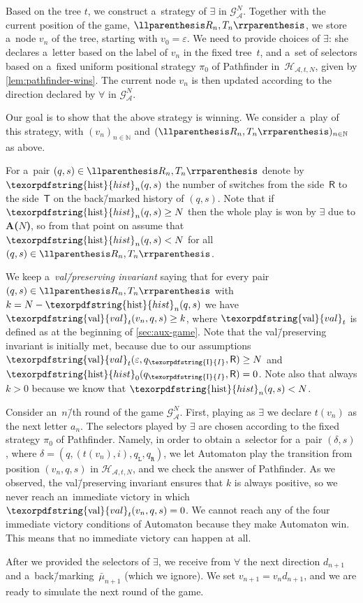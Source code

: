 \documentclass[11pt,a4paper]{amsart}
\theoremstyle{plain}
\theoremstyle{definition}
\theoremstyle{defC}
\theoremstyle{thmC}
\theoremstyle{plain}
\numberwithin{equation}{section}
\numberwithin{equation}{section}
\numberwithin{figure}{section}
\newcommand{\ident}[1]{\ensuremath{\texorpdfstring{\mathrm{\mathnm{#1}}}{#1}}\xspace}
\newcommand{\domain}[1]{\ensuremath{\mathbb{#1}}\xspace}
\newcommand{\N}{\domain{N}}
\newcommand{\mathcalsym}[1]{\ensuremath{\mathcal{#1}}\xspace}
\newcommand{\CA}{\mathcalsym{A}}
\newcommand{\CG}{\mathcalsym{G}}
\newcommand{\CH}{\mathcalsym{H}}
\newcommand{\dL}{\mathtt{{\scriptstyle L}}}
\newcommand{\dR}{\mathtt{{\scriptstyle R}}}
\newcommand{\mathnm}[1]{#1}
\newcommand{\init}{\ident{I}}
\newcommand{\hist}{\ident{hist}}
\newcommand{\val}{\ident{val}}
\newcommand{\sT}{\mathsf{T}}
\newcommand{\sR}{\mathsf{R}}
\renewcommand\epsilon\varepsilon
\newcommand{\eve}{\ensuremath{\exists}\xspace}
\newcommand{\adam}{\ensuremath{\forall}\xspace}
\DeclarePairedDelimiter{\pair}{\llparenthesis}{\rrparenthesis}
\newcommand{\itemfont}[1]{\textbf{#1}}
\begin{document}
Based on the tree $t$, we construct a~strategy of \eve in $\CG^N_\CA$.
Together with the current position of the game, $\pair{R_n,T_n}$, we store a~node $v_n$ of the tree, starting with $v_0=\epsilon$.
We need to provide choices of \eve:
she declares a~letter based on the label of $v_n$ in the fixed tree~$t$,
and a~set of selectors based on a~fixed uniform positional strategy $\pi_0$ of Pathfinder in~$\CH_{\CA,t,N}$, given by \cref{lem:pathfinder-wins}.
The current node $v_n$ is then updated according to the direction declared by \adam in $\CG^N_\CA$.

Our goal is to show that the above strategy is winning.
We consider a~play of this strategy, with $(v_n)_{n\in\N}$ and $(\pair{R_n,T_n})_{n\in\N}$ as above.

For a~pair $(q,s)\in\pair{R_n,T_n}$ denote by $\hist_n(q,s)$ the number of switches from the side~$\sR$ to the side~$\sT$ on the back\=/marked history of $(q,s)$.
Note that if $\hist_n(q,s)\geq N$ then the whole play is won by \eve due to \itemfont{A($N$)}, so from that point on assume that $\hist_n(q,s)< N$ for all $(q,s)\in\pair{R_n,T_n}$.

We keep a~\emph{val\=/preserving invariant} saying that for every pair $(q,s)\in\pair{R_n,T_n}$ with $k=N-\hist_n(q,s)$ we have $\val_t(v_n,q,s)\geq k$, where $\val_t$ is defined as at the beginning of \cref{sec:aux-game}.
Note that the val\=/preserving invariant is initially met, because due to our assumptions $\val_t(\epsilon,q_\init,\sR)\geq N$ and $\hist_0(q_\init,\sR)=0$.
Note also that always $k>0$ because we know that $\hist_n(q,s)<N$.


Consider an~$n$\=/th round of the game $\CG^N_\CA$.
First, playing as \eve we declare $t(v_n)$ as the next letter $a_n$.
The selectors played by \eve are chosen according to the fixed strategy $\pi_0$ of Pathfinder.
Namely, in order to obtain a~selector for a~pair $(\delta,s)$, where $\delta=(q,(t(v_n),i),q_\dL,q_\dR)$,
we let Automaton play the transition from position $(v_n,q,s)$ in $\CH_{\CA,t,N}$, and we check the answer of Pathfinder.
As we observed, the val\=/preserving invariant ensures that $k$ is always positive, so we never reach an~immediate victory in which $\val_t(v_n,q,s)=0$.
We cannot reach any of the four immediate victory conditions of Automaton because they make Automaton win.
This means that no immediate victory can happen at all.

After we provided the selectors of \eve, we receive from \adam the next direction $d_{n+1}$ and a~back\=/marking~$\bar{\mu}_{n+1}$ (which we ignore).
We set $v_{n+1}=v_nd_{n+1}$, and we are ready to simulate the next round of the game.
\end{document}
